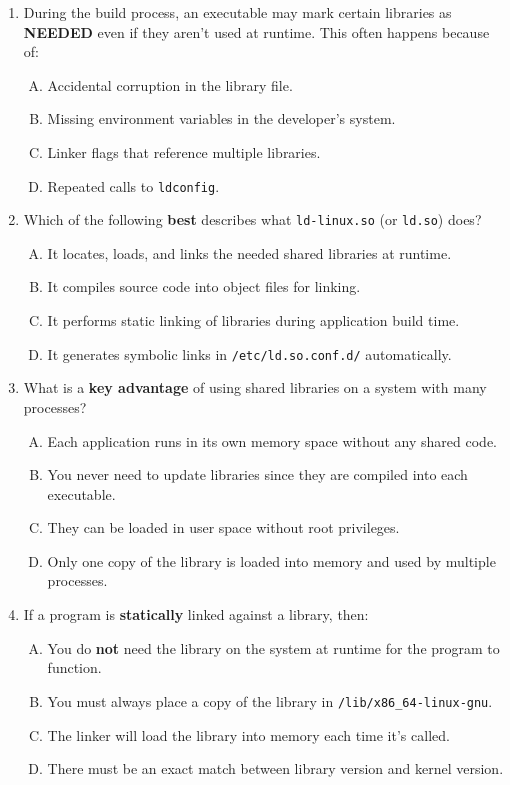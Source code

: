 \documentclass[a4paper]{report}
\begin{document}
\begin{enumerate}[1.]
    \item During the build process, an executable may mark certain libraries as \textbf{NEEDED} even if they aren’t used at runtime. This often happens because of:  
    \begin{enumerate}[A)]
        \item Accidental corruption in the library file.  
        \item Missing environment variables in the developer’s system.  
        \item Linker flags that reference multiple libraries.  
        \item Repeated calls to \texttt{ldconfig}.  
    \end{enumerate}

    \item Which of the following \textbf{best} describes what \texttt{ld-linux.so} (or \texttt{ld.so}) does?  
    \begin{enumerate}[A)]
        \item It locates, loads, and links the needed shared libraries at runtime.  
        \item It compiles source code into object files for linking.  
        \item It performs static linking of libraries during application build time.  
        \item It generates symbolic links in \texttt{/etc/ld.so.conf.d/} automatically.  
    \end{enumerate}

    \item What is a \textbf{key advantage} of using shared libraries on a system with many processes?  
    \begin{enumerate}[A)]
        \item Each application runs in its own memory space without any shared code.  
        \item You never need to update libraries since they are compiled into each executable.  
        \item They can be loaded in user space without root privileges.  
        \item Only one copy of the library is loaded into memory and used by multiple processes.  
    \end{enumerate}

    \item If a program is \textbf{statically} linked against a library, then:  
    \begin{enumerate}[A)]
        \item You do \textbf{not} need the library on the system at runtime for the program to function.  
        \item You must always place a copy of the library in \texttt{/lib/x86\_64-linux-gnu}.  
        \item The linker will load the library into memory each time it’s called.  
        \item There must be an exact match between library version and kernel version.  
    \end{enumerate}


\end{enumerate}
\end{document}

